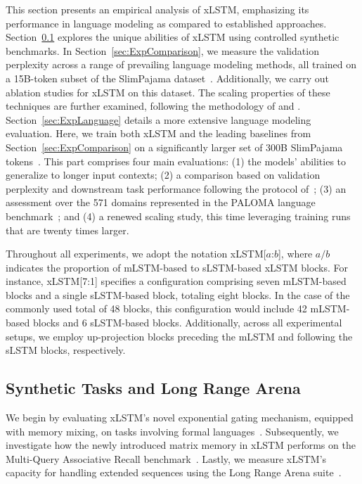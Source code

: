 This section presents an empirical analysis of xLSTM, emphasizing its performance in language modeling as compared to established approaches. Section~\ref{sec:ExpSyntethic} explores the unique abilities of xLSTM using controlled synthetic benchmarks. In Section~\ref{sec:ExpComparison}, we measure the validation perplexity across a range of prevailing language modeling methods, all trained on a 15B-token subset of the SlimPajama dataset~\citep{Soboleva:23}. Additionally, we carry out ablation studies for xLSTM on this dataset. The scaling properties of these techniques are further examined, following the methodology of \citet{Kaplan:20} and \citet{Brown:20short}. Section~\ref{sec:ExpLanguage} details a more extensive language modeling evaluation. Here, we train both xLSTM and the leading baselines from Section~\ref{sec:ExpComparison} on a significantly larger set of 300B SlimPajama tokens~\citep{Soboleva:23}. This part comprises four main evaluations: (1) the models’ abilities to generalize to longer input contexts; (2) a comparison based on validation perplexity and downstream task performance following the protocol of~\citep{Sutawika:24}; (3) an assessment over the 571 domains represented in the PALOMA language benchmark~\citep{Magnusson:23arxivshort}; and (4) a renewed scaling study, this time leveraging training runs that are twenty times larger.

\label{sec:xlstm_blocks_notation}
Throughout all experiments, we adopt the notation xLSTM[$a$:$b$], where $a/b$ indicates the proportion of mLSTM-based to sLSTM-based xLSTM blocks. For instance, xLSTM[7:1] specifies a configuration comprising seven mLSTM-based blocks and a single sLSTM-based block, totaling eight blocks. In the case of the commonly used total of 48 blocks, this configuration would include 42 mLSTM-based blocks and 6 sLSTM-based blocks. Additionally, across all experimental setups, we employ up-projection blocks preceding the mLSTM and following the sLSTM blocks, respectively.

\subsection{Synthetic Tasks and Long Range Arena}
\label{sec:ExpSyntethic}
We begin by evaluating xLSTM’s novel exponential gating mechanism, equipped with memory mixing, on tasks involving formal languages~\citep{Deletang:23}. Subsequently, we investigate how the newly introduced matrix memory in xLSTM performs on the Multi-Query Associative Recall benchmark~\citep{Arora:23arxiv}. Lastly, we measure xLSTM’s capacity for handling extended sequences using the Long Range Arena suite~\citep{Tay:21}.

